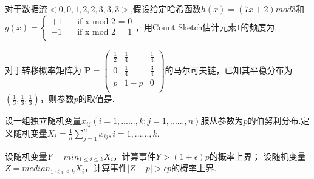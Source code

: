 \documentclass[list, windows]{BHCexam}
\begin{document}
\begin{groups}
\begin{questions}[p]
\begin{minipage}{\linewidth}
\end{minipage}
\begin{solution}{4cm}

\end{solution}
\begin{minipage}{\linewidth}
\question [4] 对于数据流$<0,0,1,2,2,3,3,3>$,假设给定哈希函数$h(x)=(7x+2) mod 3$和
$g(x) =
\begin{cases}
+1 &\quad\text{if x mod 2 = 0}\\
-1 &\quad\text{if x mod 2 = 1}\\
\end{cases}$，用Count Sketch估计元素$1$的频度为.

\end{minipage}
\begin{solution}{4cm}

\end{solution}
\begin{minipage}{\linewidth}
\question [4] 对于转移概率矩阵为
$ 
\mathbf{P}=      %
\left(                 %
  \begin{array}{ccc}   %
    \frac{1}{2} & \frac{1}{4} & \frac{1}{4}\\  %
    0 & \frac{1}{4} & \frac{3}{4}\\  %
	p & 1-p & 0\\
  \end{array}
\right)                 %
$的马尔可夫链，已知其平稳分布为$(\frac{1}{3},\frac{1}{3},\frac{1}{3})$，则参数$p$的取值是.

\end{minipage}
\begin{solution}{4cm}

\end{solution}

\end{questions}
\newpage
{}

\begin{questions}[p]
\begin{minipage}{\linewidth}
\question [20] 设一组独立随机变量$x_{ij}(i = 1,......,k;j=1,......,n)$服从参数为$p$的伯努利分布.定义随机变量$X_{i}=\frac{1}{n}\sum_{j=1}^{n}x_{ij},i = 1,......,k$.
\begin{subquestions}
	\subquestion 设随机变量$Y = min_{1\leq i\leq k}X_{i}$，计算事件$Y>(1+\epsilon)p$的概率上界；
	\subquestion 设随机变量$Z = median_{1\leq i\leq k}X_{i}$，计算事件$|Z-p|>\epsilon p$的概率上界.
\end{subquestions}
\end{minipage}
\begin{solution}{4cm}


\end{solution}
\end{questions}
\end{groups}
\end{document}
